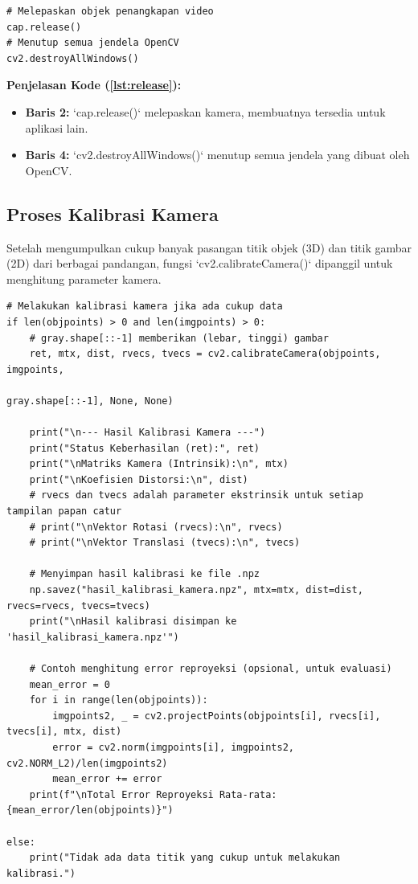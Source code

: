 \documentclass[12pt,a4paper]{article}
\begin{document}
\begin{lstlisting}[caption=Melepaskan Sumber Daya, label=lst:release]
# Melepaskan objek penangkapan video
cap.release()
# Menutup semua jendela OpenCV
cv2.destroyAllWindows()
\end{lstlisting}

\textbf{Penjelasan Kode (\ref{lst:release}):}
\begin{itemize}
    \item \textbf{Baris 2:} `cap.release()` melepaskan kamera, membuatnya tersedia untuk aplikasi lain.
    \item \textbf{Baris 4:} `cv2.destroyAllWindows()` menutup semua jendela yang dibuat oleh OpenCV.
\end{itemize}

\subsection{Proses Kalibrasi Kamera}
Setelah mengumpulkan cukup banyak pasangan titik objek (3D) dan titik gambar
(2D) dari berbagai pandangan, fungsi `cv2.calibrateCamera()` dipanggil untuk
menghitung parameter kamera.

\begin{lstlisting}[caption=Kalibrasi Kamera, label=lst:calibrate]
# Melakukan kalibrasi kamera jika ada cukup data
if len(objpoints) > 0 and len(imgpoints) > 0:
    # gray.shape[::-1] memberikan (lebar, tinggi) gambar
    ret, mtx, dist, rvecs, tvecs = cv2.calibrateCamera(objpoints, imgpoints, 
                                                      gray.shape[::-1], None, None)

    print("\n--- Hasil Kalibrasi Kamera ---")
    print("Status Keberhasilan (ret):", ret)
    print("\nMatriks Kamera (Intrinsik):\n", mtx)
    print("\nKoefisien Distorsi:\n", dist)
    # rvecs dan tvecs adalah parameter ekstrinsik untuk setiap tampilan papan catur
    # print("\nVektor Rotasi (rvecs):\n", rvecs)
    # print("\nVektor Translasi (tvecs):\n", tvecs)

    # Menyimpan hasil kalibrasi ke file .npz
    np.savez("hasil_kalibrasi_kamera.npz", mtx=mtx, dist=dist, rvecs=rvecs, tvecs=tvecs)
    print("\nHasil kalibrasi disimpan ke 'hasil_kalibrasi_kamera.npz'")

    # Contoh menghitung error reproyeksi (opsional, untuk evaluasi)
    mean_error = 0
    for i in range(len(objpoints)):
        imgpoints2, _ = cv2.projectPoints(objpoints[i], rvecs[i], tvecs[i], mtx, dist)
        error = cv2.norm(imgpoints[i], imgpoints2, cv2.NORM_L2)/len(imgpoints2)
        mean_error += error
    print(f"\nTotal Error Reproyeksi Rata-rata: {mean_error/len(objpoints)}")

else:
    print("Tidak ada data titik yang cukup untuk melakukan kalibrasi.")
\end{lstlisting}
\end{document}
